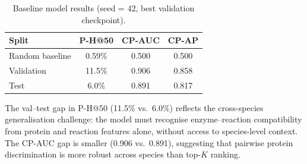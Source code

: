 \begin{table}[h]
\centering
\caption{Baseline model results (seed = 42, best validation checkpoint).
}
\label{tab:results}
\begin{tabular}{lccc}
\toprule
Split & P-H@50 & CP-AUC & CP-AP \\
\midrule
Random baseline  & 0.59\%  & 0.500 & 0.500 \\
\midrule
Validation       & 11.5\%  & 0.906 & 0.858 \\
Test             &  6.0\%  & 0.891 & 0.817 \\
\bottomrule
\end{tabular}
\end{table}

\noindent
The val–test gap in P-H@50 (11.5\% vs.\ 6.0\%) reflects the cross-species
generalisation challenge: the model must recognise enzyme–reaction compatibility
from protein and reaction features alone, without access to species-level context.
The CP-AUC gap is smaller (0.906 vs.\ 0.891), suggesting that pairwise protein
discrimination is more robust across species than top-$K$ ranking.
